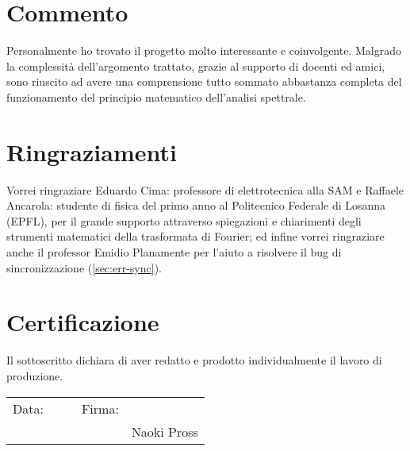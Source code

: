 \section{Commento}
Personalmente ho trovato il progetto molto interessante e coinvolgente.
Malgrado la complessit\`a dell'argomento trattato, grazie al supporto di
docenti ed amici, sono riuscito ad avere una comprensione tutto sommato
abbastanza completa del funzionamento del principio matematico dell'analisi
spettrale.

\section{Ringraziamenti}
Vorrei ringraziare Eduardo Cima: professore di elettrotecnica alla SAM e
Raffaele Ancarola: studente di fisica del primo anno al Politecnico Federale
di Losanna (EPFL), per il grande supporto attraverso spiegazioni e chiarimenti
degli strumenti matematici della trasformata di Fourier; ed infine vorrei
ringraziare anche il professor Emidio Planamente per l'aiuto a risolvere il
bug di sincronizzazione (\ref{sec:err-sync}).


\section{Certificazione}
Il sottoscritto dichiara di aver redatto e prodotto individualmente il lavoro
di produzione.
\begin{flushright}
\begin{tabular}{ r p{5cm} p{1cm} r p{5cm}}
    Data: & \hrulefill && Firma: & \hrulefill \\
    &&&& Naoki Pross \\
\end{tabular}
\end{flushright}
